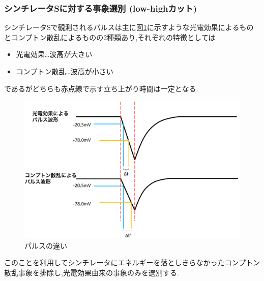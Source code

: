 \subsubsection{シンチレータSに対する事象選別 (low-highカット)}
シンチレータSで観測されるパルスは主に図\ref{fig:pulse_diff}に示すような光電効果によるものとコンプトン散乱によるものの2種類あり,それぞれの特徴としては
\begin{itemize}
	\item 光電効果…波高が大きい
	\item コンプトン散乱…波高が小さい
\end{itemize}
であるがどちらも赤点線で示す立ち上がり時間は一定となる.
\begin{figure}[H]
	\centering
		\includegraphics[width=15cm]{fig/isb/pulse_difference.pdf}
		\caption{パルスの違い}
		\label{fig:pulse_diff}
\end{figure}
このことを利用してシンチレータにエネルギーを落としきらなかったコンプトン散乱事象を排除し,光電効果由来の事象のみを選別する.

